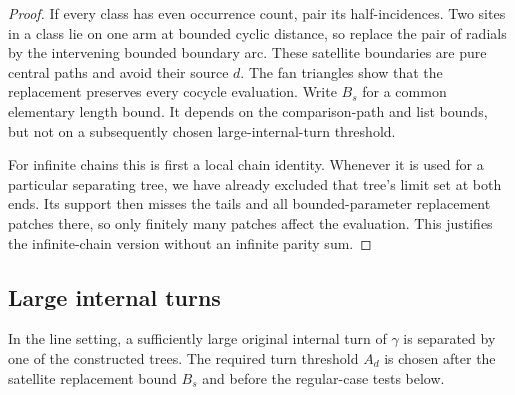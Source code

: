 \begin{proof}
If every class has even occurrence count, pair its half-incidences. Two
sites in a class lie on one arm at bounded cyclic distance, so replace the
pair of radials by the intervening bounded boundary arc. These satellite
boundaries are pure central paths and avoid their source $d$. The fan
triangles show that the replacement preserves every cocycle evaluation.
Write $B_s$ for a common elementary length bound. It depends on the
comparison-path and list bounds, but not on a subsequently chosen
large-internal-turn threshold.

For infinite chains this is first a local chain identity. Whenever it is
used for a particular separating tree, we have already excluded that
tree's limit set at both ends. Its support then misses the tails and all
bounded-parameter replacement patches there, so only finitely many patches
affect the evaluation. This justifies the infinite-chain version without
an infinite parity sum.
\end{proof}

\subsection{Large internal turns}

\begin{lemma}\label{boundary:large-internal}
In the line setting, a sufficiently large original internal turn of
$\gamma$ is separated by one of the constructed trees. The required turn
threshold $A_d$ is chosen after the satellite replacement bound $B_s$ and
before the regular-case tests below.
\end{lemma}

